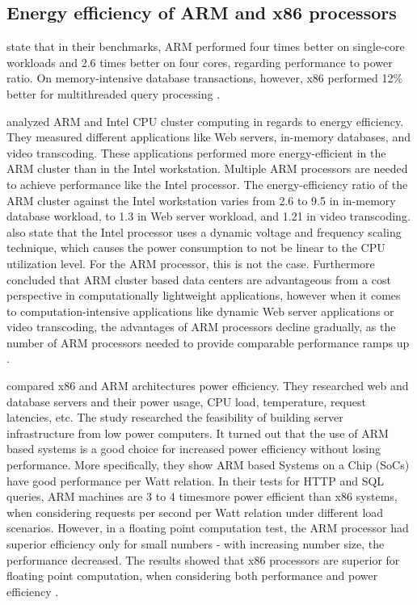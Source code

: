 \subsection{Energy efficiency of ARM and x86 processors}

\citeauthor{maqbool2015evaluating} \cite{maqbool2015evaluating}
state that in their benchmarks, ARM performed four times better on single-core workloads and
2.6 times better on four cores, regarding performance to power ratio.
On memory-intensive database transactions, however, x86 performed 12\% better for multithreaded query processing
\cite{maqbool2015evaluating}.

\citeauthor{ou2012energy} \cite{ou2012energy} 
analyzed ARM and Intel CPU cluster computing in regards to energy efficiency. 
They measured different applications like Web servers, in-memory databases, and video transcoding. 
These applications performed more energy-efficient in the ARM cluster than in the Intel workstation. 
Multiple ARM processors are needed to achieve performance like the Intel processor. 
The energy-efficiency ratio of the ARM cluster against the Intel workstation varies from 2.6  to 9.5 in
in-memory database workload, to 1.3 in Web server workload, and 1.21 in video transcoding. 
\citeauthor{ou2012energy} \cite{ou2012energy} also state that the Intel processor
uses a dynamic voltage and frequency scaling technique, which 
causes the power consumption to not be linear to the CPU utilization level.
For the ARM processor, this is not the case.
Furthermore \citeauthor{ou2012energy} \cite{ou2012energy} concluded that ARM cluster 
based data centers are advantageous from a cost perspective
in computationally lightweight applications,
however when it comes to computation-intensive applications
like dynamic Web server applications or video transcoding, the advantages
of ARM processors decline gradually, as the number of ARM processors needed 
to provide comparable performance ramps up
\cite{ou2012energy}.

\citeauthor{aroca2012towards} \cite{aroca2012towards} compared x86 and ARM architectures power efficiency.
They researched web and database servers and their power usage, CPU load, temperature, request latencies, etc.
The study researched the feasibility of building server infrastructure from low power computers. 
It turned out that the use of ARM based systems is a good choice for increased power efficiency without losing performance.
More specifically, they show ARM based Systems on a Chip (SoCs) have good performance per Watt relation.
In their tests for HTTP and SQL queries, ARM machines are 3 to 4 timesmore power efficient than x86 systems, 
when considering requests per second per Watt relation under different load scenarios.
However, in a floating point computation test, the ARM processor had 
superior efficiency only for small numbers - with increasing number size, the performance decreased. 
The results showed that x86 processors are superior for floating point computation, 
when considering both performance and power efficiency
\cite{aroca2012towards}.


